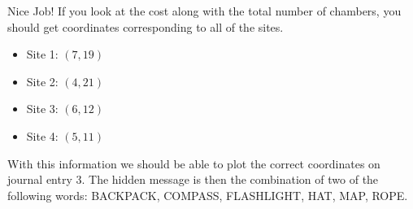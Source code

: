Nice Job!
If you look at the cost along with the total number of chambers, you should get coordinates corresponding to all of the sites.
\begin{itemize}
        \item Site 1: \((7,19)\)
        \item Site 2: \((4,21)\)
        \item Site 3: \((6,12)\)
        \item Site 4: \((5,11)\)
\end{itemize}

With this information we should be able to plot the correct coordinates on journal entry 3. The hidden message is then the combination of two of the following words:
BACKPACK, COMPASS, FLASHLIGHT, HAT, MAP, ROPE.